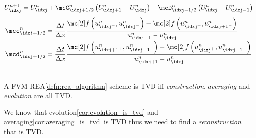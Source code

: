 \begin{corbox}\nospacing
    \begin{cor}\label{cor:fvm_evolution_and_averaging_in_incremental_form}
        \begin{align*}
        U_{\idxj}^{n+1}=U_{\idxj}^{n}+\mcC_{\idxj+1/2}^{n} \left(U_{\idxj+1}^{n}-U_{\idxj}^{n}\right)-\mcD_{\idxj-1/2}^{n} \left(U_{\idxj}^{n}-U_{\idxj-1}^{n}\right)\label{eq:finite_volume_scheme_incremental_form}
        \end{align*}
        \begin{align}
          &\mcc_{\idxj+1/2}^{n}=\frac{\Delta t}{\Delta x}\frac{\flux \left(u_{\idxj^+}^{n},u_{\idxj^{-}}^{n}\right)-\flux \left(u_{\idxj^+}^{n},u_{\idxj+1^{-}}^{n}\right)}{u_{\idxj+1}^{n}-u_{\idxj}^{n}}\nonumber\\[-1\jot]
          &\mcd_{\idxj+1/2}^{n}=\frac{\Delta t}{\Delta x}\frac{\flux \left(u_{\idxj+1^+}^{n},u_{\idxj+1^{-}}^{n}\right)-\flux \left(u_{\idxj^+}^{n},u_{\idxj-1^{-}}^{n}\right)}{u_{\idxj+1}^{n}-u_{\idxj}^{n}}
        \end{align}
    \end{cor}
\end{corbox}
\begin{lemmabox}\nospacing
    \begin{lemma}\leavevmode\\
        A FVM REA\cref{defn:rea_algorithm} scheme is TVD iff \textit{construction}, \textit{averaging} and \textit{evolution} are all TVD.
    \end{lemma}
\end{lemmabox}
\begin{sectionbox}\nospacing
	We know that evolution\cref{cor:evolution_is_tvd} and averaging\cref{cor:averaging_is_tvd} is TVD thus we need to find a \textit{reconstruction} that is TVD.
\end{sectionbox}
